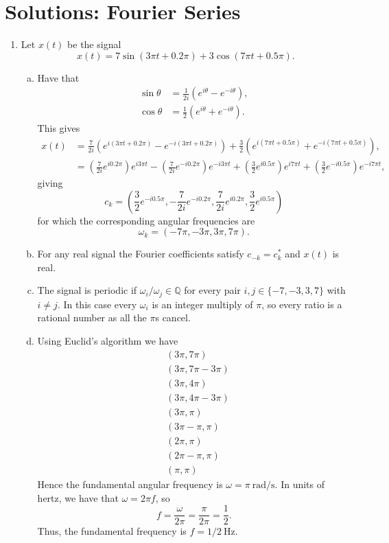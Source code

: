 \newpage
\section*{Solutions: Fourier Series}

\begin{enumerate}
\item Let $x(t)$ be the signal 
$$x(t)=7\sin(3\pi t+0.2\pi)+3\cos(7\pi t+0.5\pi).$$

\begin{enumerate}[a)]
\item Have that
\begin{align*}
    \sin\theta&=\frac{1}{2i}(e^{i\theta}-e^{-i\theta}), \\
    \cos\theta&=\frac{1}{2}(e^{i\theta}+e^{-i\theta}).
\end{align*}
This gives
\begin{align*}
    x(t)&=\frac{7}{2i}(e^{i(3\pi t+0.2\pi)}-e^{-i(3\pi t+0.2\pi)})+ \frac{3}{2}(e^{i(7\pi t+0.5\pi)}+e^{-i(7\pi t+0.5\pi)}), \\
    &=\left(\frac{7}{2i}e^{i0.2\pi}\right)e^{i3\pi t}-\left(\frac{7}{2i}e^{-i0.2\pi}\right)e^{-i3\pi t} + \left(\frac{3}{2}e^{i0.5\pi}\right)e^{i7\pi t}+\left(\frac{3}{2}e^{-i0.5\pi}\right)e^{-i7\pi t},
\end{align*}
giving
$$c_{k}=\left(\frac{3}{2}e^{-i0.5\pi},-\frac{7}{2i}e^{-i0.2\pi},\frac{7}{2i}e^{i0.2\pi},\frac{3}{2}e^{i0.5\pi}\right)$$
for which the corresponding angular frequencies are
$$\omega_{k}=(-7\pi,-3\pi,3\pi,7\pi).$$

\item For any real signal the Fourier coefficients satisfy $c_{-k}=c_{k}^{*}$ and $x(t)$ is real. 

\item The signal is periodic if $\omega_{i}/\omega_{j}\in\mathbb{Q}$ for every pair $i,j\in \{-7,-3,3,7\}$ with $i\neq j$. In this case every $\omega_{i}$ is an integer multiply of $\pi$, so every ratio is a rational number as all the $\pi$s cancel.

\item Using Euclid's algorithm we have
\begin{align*}
    &(3\pi,7\pi) \\
    &(3\pi,7\pi-3\pi) \\
    &(3\pi,4\pi) \\
    &(3\pi,4\pi-3\pi) \\
    &(3\pi,\pi) \\
    &(3\pi-\pi,\pi) \\
    &(2\pi,\pi) \\
    &(2\pi-\pi,\pi) \\
    &(\pi,\pi)
\end{align*}
Hence the fundamental angular frequency is $\omega=\pi\ \text{rad/s}$. In units of hertz, we have that $\omega=2\pi f$, so
$$f=\frac{\omega}{2\pi}=\frac{\pi}{2\pi}=\frac{1}{2}.$$
Thus, the fundamental frequency is $f=1/2\ \text{Hz}$. 


\end{enumerate}
\end{enumerate}
